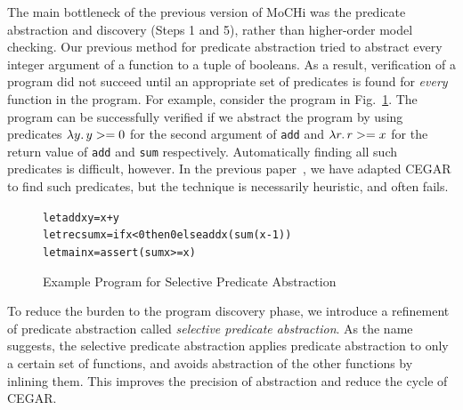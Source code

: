 The main bottleneck of the previous version of MoCHi was the predicate
abstraction and discovery (Steps 1 and 5), rather than higher-order
model checking. Our previous method for predicate abstraction tried to
abstract every integer argument of a function to a tuple of booleans. As
a result, verification of a program did not succeed until an appropriate
set of predicates is found for \emph{every} function in the program.
For example, consider the program in Fig.~\ref{fig:abst-example}.  The
program can be successfully verified if we abstract the program by using
predicates $\lambda{y}.\,{y>=0}$ for the second argument of \texttt{add} and
$\lambda{r}.\,{r>=x}$ for the return value of \texttt{add} and \texttt{sum} respectively.
Automatically finding all such predicates is difficult, however.  In the
previous paper~\cite{KobayashiPLDI2011}, we have adapted CEGAR to find
such predicates, but the technique is necessarily heuristic, and often
fails.

\begin{figure}[t]
\begin{alltt}
let add x y = x + y
let rec sum x = if x < 0 then 0 else add x (sum (x-1))
let main x = assert (sum x >= x)
\end{alltt}
\caption{Example Program for Selective Predicate Abstraction}
\label{fig:abst-example}
\end{figure}


To reduce the burden to the program discovery phase, we introduce a refinement
of predicate abstraction called \emph{selective predicate abstraction}.
As the name suggests, the selective predicate abstraction applies
predicate abstraction to only a certain set of functions, and avoids
abstraction of the other functions by inlining them.
This improves the precision of abstraction and reduce the cycle of CEGAR.


